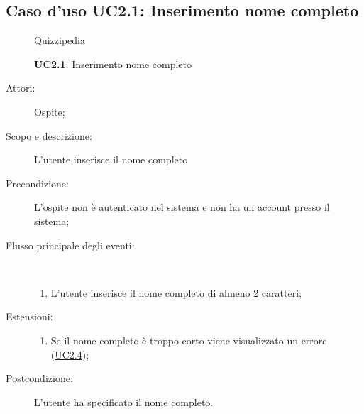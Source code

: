 \subsection{Caso d'uso UC2.1: Inserimento nome completo}
	\begin{figure}[H]
		\centering
		\begin{resizedtikzpicture}{\textwidth}
		\begin{umlsystem}[x=0, fill=lightgray!20]{Quizzipedia}
		\end{umlsystem}
		\end{resizedtikzpicture}
		\caption{\textbf{UC2.1}: Inserimento nome completo}
		\label{UC2.1}
	\end{figure}
\begin{description}
\item[Attori:] Ospite;
\item[Scopo e descrizione:] L'utente inserisce il nome completo
      \item[Precondizione:] L'ospite non è autenticato nel sistema e non ha un account presso il sistema;

        \item[Flusso principale degli eventi:] \ 
 \begin{enumerate}
          \item L'utente inserisce il nome completo di almeno 2 caratteri;

      \end{enumerate}
    \item[Estensioni:]
      \begin{enumerate}
          \item Se il nome completo è troppo corto viene visualizzato un errore (\hyperlink{UC2.4}{UC2.4});

      \end{enumerate}
    \item[Postcondizione:] L'utente ha specificato il nome completo.
  \end{description}
\hypertarget{UC2.2}{}
